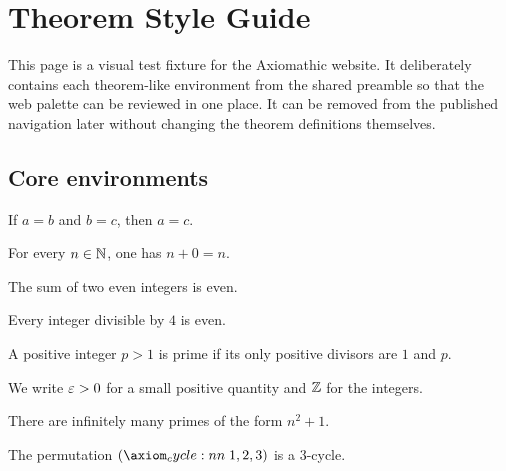 \documentclass[../../Axiomathic.tex]{subfiles}
\begin{document}
\graphicspath{{sections/style/images/}{images/}}


\chapter{Theorem Style Guide}

This page is a visual test fixture for the Axiomathic website. It deliberately
contains each theorem-like environment from the shared preamble so that the web
palette can be reviewed in one place. It can be removed from the published
navigation later without changing the theorem definitions themselves.

\section{Core environments}

\begin{theorem}
If $a=b$ and $b=c$, then $a=c$.
\end{theorem}

\begin{lemma}
For every $n\in\mathbb N$, one has $n+0=n$.
\end{lemma}

\begin{prop}
The sum of two even integers is even.
\end{prop}

\begin{corollary}
Every integer divisible by $4$ is even.
\end{corollary}

\begin{defn}
A positive integer $p>1$ is prime if its only positive divisors are $1$ and $p$.
\end{defn}

\begin{nota}
We write $\varepsilon>0$ for a small positive quantity and $\mathbb Z$ for the integers.
\end{nota}

\begin{conj}
There are infinitely many primes of the form $n^2+1$.
\end{conj}

\begin{example}
The permutation $\cycle{1,2,3}$ is a $3$-cycle.
\end{example}
\end{document}
